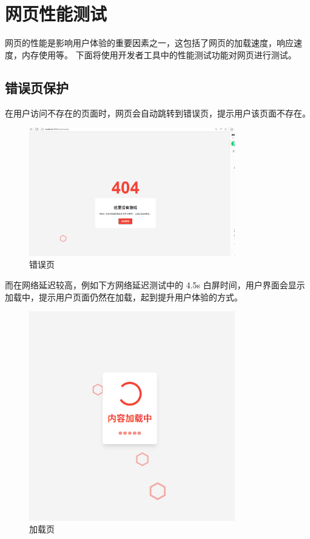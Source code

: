 \documentclass[12pt]{ctexart} %
\begin{document}
\section{网页性能测试}
网页的性能是影响用户体验的重要因素之一，这包括了网页的加载速度，响应速度，内存使用等。
下面将使用开发者工具中的性能测试功能对网页进行测试。


\subsection{错误页保护}

在用户访问不存在的页面时，网页会自动跳转到错误页，提示用户该页面不存在。
\begin{figure}[H]
  \centering
  \includegraphics[width=0.8\textwidth]{front-page3.png}
  \caption{错误页}
\end{figure}

而在网络延迟较高，例如下方网络延迟测试中的 4.5s 白屏时间，用户界面会显示加载中，提示用户页面仍然在加载，起到提升用户体验的方式。


\begin{figure}[H]
  \centering
  \includegraphics[width=0.8\textwidth]{front-page5.png}
  \caption{加载页}
\end{figure}
\end{document}
